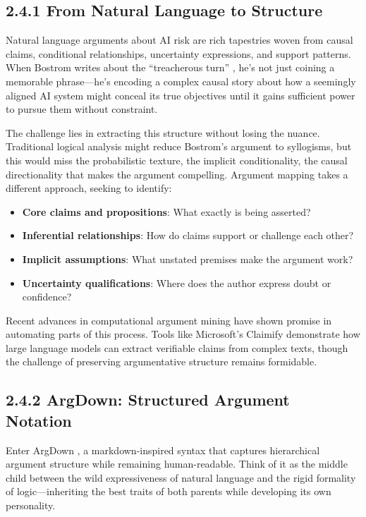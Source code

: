 \documentclass[
  11pt,
  letterpaper,
]{book}
\providecommand{\tightlist}{%
  \setlength{\itemsep}{0pt}\setlength{\parskip}{0pt}}
\begin{document}
\subsection{2.4.1 From Natural Language to
Structure}\label{sec-natural-to-structure}

Natural language arguments about AI risk are rich tapestries woven from
causal claims, conditional relationships, uncertainty expressions, and
support patterns. When Bostrom writes about the ``treacherous turn''
\textcite{bostrom2014}, he's not just coining a memorable phrase---he's
encoding a complex causal story about how a seemingly aligned AI system
might conceal its true objectives until it gains sufficient power to
pursue them without constraint.

The challenge lies in extracting this structure without losing the
nuance. Traditional logical analysis might reduce Bostrom's argument to
syllogisms, but this would miss the probabilistic texture, the implicit
conditionality, the causal directionality that makes the argument
compelling. Argument mapping takes a different approach, seeking to
identify:

\begin{itemize}
\tightlist
\item
  \textbf{Core claims and propositions}: What exactly is being asserted?
\item
  \textbf{Inferential relationships}: How do claims support or challenge
  each other?
\item
  \textbf{Implicit assumptions}: What unstated premises make the
  argument work?
\item
  \textbf{Uncertainty qualifications}: Where does the author express
  doubt or confidence?
\end{itemize}

Recent advances in computational argument mining \textcite{anderson2007}
\textcite{benn2011} \textcite{khartabil2021} have shown promise in
automating parts of this process. Tools like Microsoft's Claimify
\textcite{metropolitansky2025} demonstrate how large language models can
extract verifiable claims from complex texts, though the challenge of
preserving argumentative structure remains formidable.

\subsection{2.4.2 ArgDown: Structured Argument
Notation}\label{sec-argdown-notation}

Enter ArgDown \textcite{voigt2025}, a markdown-inspired syntax that
captures hierarchical argument structure while remaining human-readable.
Think of it as the middle child between the wild expressiveness of
natural language and the rigid formality of logic---inheriting the best
traits of both parents while developing its own personality.
\end{document}
